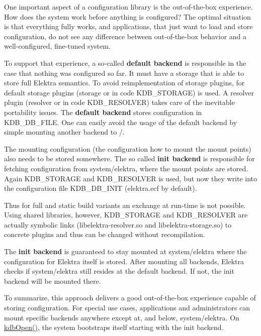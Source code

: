 One important aspect of a configuration library is the out-\/of-\/the-\/box experience. How does the system work before anything is configured? The optimal situation is that everything fully works, and applications, that just want to load and store configuration, do not see any difference between out-\/of-\/the-\/box behavior and a well-\/configured, fine-\/tuned system.

To support that experience, a so-\/called {\bfseries{default backend}} is responsible in the case that nothing was configured so far. It must have a storage that is able to store full Elektra semantics. To avoid reimplementation of storage plugins, for default storage plugins ({\ttfamily storage} or in code {\ttfamily K\+D\+B\+\_\+\+S\+T\+O\+R\+A\+GE}) is used. A resolver plugin ({\ttfamily resolver} or in code {\ttfamily K\+D\+B\+\_\+\+R\+E\+S\+O\+L\+V\+ER}) takes care of the inevitable portability issues. The {\bfseries{default backend}} stores configuration in {\ttfamily K\+D\+B\+\_\+\+D\+B\+\_\+\+F\+I\+LE}. One can easily avoid the usage of the default backend by simple mounting another backend to {\ttfamily /}.

The mounting configuration (the configuration how to mount the mount points) also needs to be stored somewhere. The so called {\bfseries{init backend}} is responsible for fetching configuration from {\ttfamily system/elektra}, where the mount points are stored. Again {\ttfamily K\+D\+B\+\_\+\+S\+T\+O\+R\+A\+GE} and {\ttfamily K\+D\+B\+\_\+\+R\+E\+S\+O\+L\+V\+ER} is used, but now they write into the configuration file {\ttfamily K\+D\+B\+\_\+\+D\+B\+\_\+\+I\+N\+IT} ({\ttfamily elektra.\+ecf} by default).

Thus for full and static build variants an exchange at run-\/time is not possible. Using shared libraries, however, {\ttfamily K\+D\+B\+\_\+\+S\+T\+O\+R\+A\+GE} and {\ttfamily K\+D\+B\+\_\+\+R\+E\+S\+O\+L\+V\+ER} are actually symbolic links ({\ttfamily libelektra-\/resolver.\+so} and {\ttfamily libelektra-\/storage.\+so}) to concrete plugins and thus can be changed without recompilation.

The {\bfseries{init backend}} is guaranteed to stay mounted at {\ttfamily system/elektra} where the configuration for Elektra itself is stored. After mounting all backends, Elektra checks if {\ttfamily system/elektra} still resides at the default backend. If not, the init backend will be mounted there.

To summarize, this approach delivers a good out-\/of-\/the-\/box experience capable of storing configuration. For special use cases, applications and administrators can mount specific backends anywhere except at, and below, {\ttfamily system/elektra}. On {\ttfamily \mbox{\hyperlink{group__kdb_ga6808defe5870f328dd17910aacbdc6ca}{kdb\+Open()}}}, the system bootstraps itself starting with the init backend.

